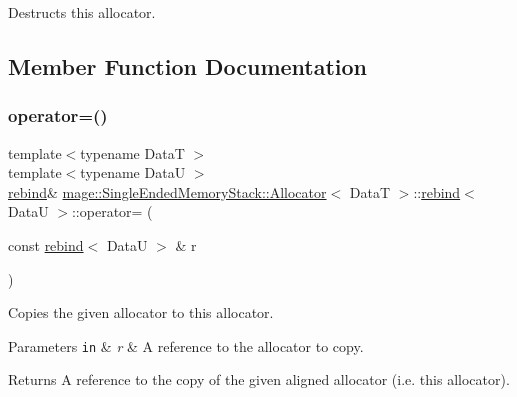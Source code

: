Destructs this allocator. 

\subsection{Member Function Documentation}
\hypertarget{structmage_1_1_single_ended_memory_stack_1_1_allocator_1_1rebind_a9449ba02ed51f463c71ae6dcb252b4f0}{}\label{structmage_1_1_single_ended_memory_stack_1_1_allocator_1_1rebind_a9449ba02ed51f463c71ae6dcb252b4f0} 
\subsubsection{\texorpdfstring{operator=()}{operator=()}\hspace{0.1cm}{\footnotesize\ttfamily [1/2]}}
{\footnotesize\ttfamily template$<$typename DataT $>$ \\
template$<$typename DataU $>$ \\
\hyperlink{structmage_1_1_single_ended_memory_stack_1_1_allocator_1_1rebind}{rebind}\& \hyperlink{structmage_1_1_single_ended_memory_stack_1_1_allocator}{mage\+::\+Single\+Ended\+Memory\+Stack\+::\+Allocator}$<$ DataT $>$\+::\hyperlink{structmage_1_1_single_ended_memory_stack_1_1_allocator_1_1rebind}{rebind}$<$ DataU $>$\+::operator= (\begin{DoxyParamCaption}\item[{const \hyperlink{structmage_1_1_single_ended_memory_stack_1_1_allocator_1_1rebind}{rebind}$<$ DataU $>$ \&}]{r }\end{DoxyParamCaption})\hspace{0.3cm}{\ttfamily [delete]}}

Copies the given allocator to this allocator.


\begin{DoxyParams}[1]{Parameters}
\mbox{\tt in}  & {\em r} & A reference to the allocator to copy. \\
\hline
\end{DoxyParams}
\begin{DoxyReturn}{Returns}
A reference to the copy of the given aligned allocator (i.\+e. this allocator). 
\end{DoxyReturn}
\hypertarget{structmage_1_1_single_ended_memory_stack_1_1_allocator_1_1rebind_addeb41019900164bff956ca31d2f5051}{}\label{structmage_1_1_single_ended_memory_stack_1_1_allocator_1_1rebind_addeb41019900164bff956ca31d2f5051} 
